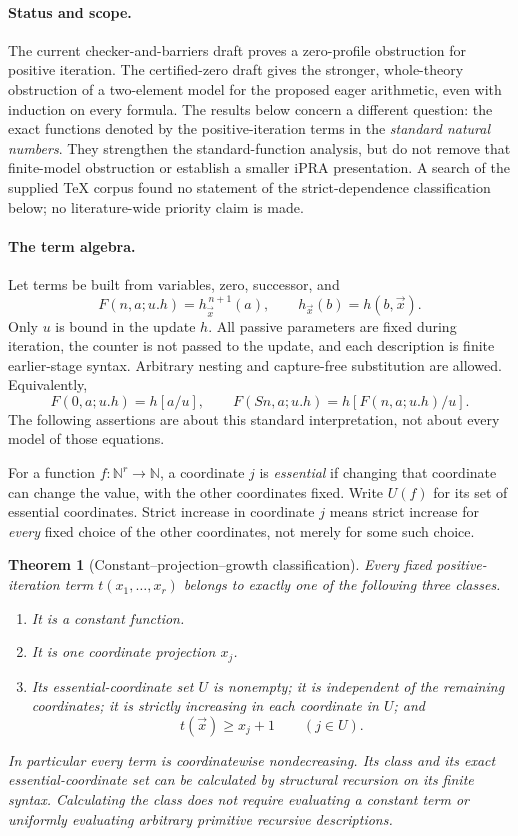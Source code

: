\documentclass[11pt,letterpaper]{article}
\newtheorem{theorem}{Theorem}[section]
\theoremstyle{definition}\newtheorem{definition}[theorem]{Definition}
\theoremstyle{remark}\newtheorem{remark}[theorem]{Remark}
\begin{document}
\paragraph{Status and scope.}
The current checker-and-barriers draft proves a zero-profile obstruction
for positive iteration. The certified-zero draft gives the stronger,
whole-theory obstruction of a two-element model for the proposed eager
arithmetic, even with induction on every formula. The results below concern
a different question: the exact functions denoted by the positive-iteration
terms in the \emph{standard natural numbers}. They strengthen the
standard-function analysis, but do not remove that finite-model obstruction
or establish a smaller iPRA presentation. A search of the supplied TeX
corpus found no statement of the strict-dependence classification below;
no literature-wide priority claim is made.

\paragraph{The term algebra.}
Let terms be built from variables, zero, successor, and
\[
 F(n,a;u.h)=h_{\vec x}^{\,n+1}(a),\qquad
 h_{\vec x}(b)=h(b,\vec x).
\]
Only $u$ is bound in the update $h$. All passive parameters are fixed
during iteration, the counter is not passed to the update, and each
description is finite earlier-stage syntax. Arbitrary nesting and
capture-free substitution are allowed. Equivalently,
\[
 F(0,a;u.h)=h[a/u],\qquad
 F(Sn,a;u.h)=h[F(n,a;u.h)/u].
\]
The following assertions are about this standard interpretation, not about
every model of those equations.

For a function $f:\mathbb N^r\to\mathbb N$, a coordinate $j$ is
\emph{essential} if changing that coordinate can change the value, with
the other coordinates fixed. Write $U(f)$ for its set of essential
coordinates. Strict increase in coordinate $j$ means strict increase for
\emph{every} fixed choice of the other coordinates, not merely for some
such choice.

\begin{theorem}[Constant--projection--growth classification]
\label{thm:positive-classification}
Every fixed positive-iteration term $t(x_1,\ldots,x_r)$ belongs to exactly
one of the following three classes.
\begin{enumerate}
\item It is a constant function.
\item It is one coordinate projection $x_j$.
\item Its essential-coordinate set $U$ is nonempty; it is independent of
      the remaining coordinates; it is strictly increasing in each
      coordinate in $U$; and
      \[
             t(\vec x)\geq x_j+1\qquad(j\in U).
      \]
\end{enumerate}
In particular every term is coordinatewise nondecreasing. Its class and
its exact essential-coordinate set can be calculated by structural
recursion on its finite syntax. Calculating the class does not require
evaluating a constant term or uniformly evaluating arbitrary primitive
recursive descriptions.
\end{theorem}
\end{document}
